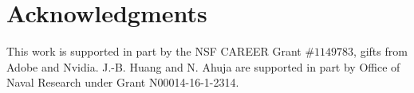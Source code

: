 \documentclass[10pt,twocolumn,letterpaper]{article}
\begin{document}
	\section*{Acknowledgments}
	\vspace{-0.1cm}
	This work is supported in part by the NSF CAREER Grant $\#1149783$, gifts from Adobe and Nvidia. J.-B. Huang and N. Ahuja are supported in part by Office of Naval Research under Grant N00014-16-1-2314.
	
	\clearpage
	{\small
		
		
	}
\end{document}
